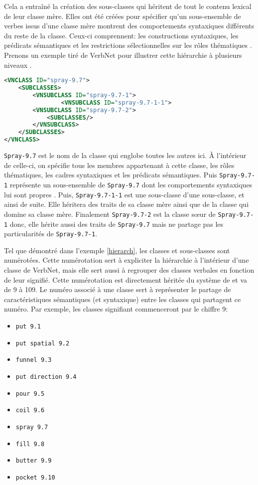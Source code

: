 Cela a entraîné la création des sous-classes qui héritent de tout le contenu lexical de leur classe mère. Elles ont été créées pour spécifier qu'un sous-ensemble de verbes issus d'une classe mère montrent des comportements syntaxiques différents du reste de la classe. Ceux-ci comprennent: les constructions syntaxiques, les prédicats sémantiques et les restrictions sélectionnelles sur les rôles thématiques \citep{SchulerVerbnetBroadcoverageComprehensive2005}. Prenons un exemple tiré de VerbNet pour illustrer cette hiérarchie à plusieurs niveaux \citep{CLEARVerbNetAnnotationGuidelines2005}.

\begin{lstlisting}[language=XML, caption = Hiérarchie, label=hierarch]
<VNCLASS ID="spray-9.7">
    <SUBCLASSES>
        <VNSUBCLASS ID="spray-9.7-1">
                <VNSUBCLASS ID="spray-9.7-1-1">
        <VNSUBCLASS ID="spray-9.7-2">
            <SUBCLASSES/>
        </VNSUBCLASS>
    </SUBCLASSES>
</VNCLASS>
\end{lstlisting}

\texttt{Spray-9.7} est le nom de la classe qui englobe toutes les autres ici. À l'intérieur de celle-ci, on spécifie tous les membres appartenant à cette classe, les rôles thématiques, les cadres syntaxiques et les prédicats sémantiques. Puis \texttt{Spray-9.7-1} représente un sous-ensemble de \texttt{Spray-9.7} dont les comportements syntaxiques lui sont propres .  Puis, \texttt{Spray-9.7-1-1} est une sous-classe d'une sous-classe, et ainsi de suite. Elle héritera des traits de sa classe mère ainsi que de la classe qui domine sa classe mère. Finalement \texttt{Spray-9.7-2} est la classe sœur de \texttt{Spray-9.7-1} donc, elle hérite aussi des traits de \texttt{Spray-9.7} mais ne partage pas les particularités de \texttt{Spray-9.7-1}.

Tel que démontré dans l'exemple \ref{hierarch}, les classes et sous-classes sont numérotées. Cette numérotation sert à expliciter la hiérarchie à l'intérieur d'une classe de VerbNet, mais elle sert aussi à regrouper des classes verbales en fonction de leur signifié. Cette numérotation est directement héritée du système de \cite{verb-classes.levin.1993} et va de 9 à 109. Le numéro associé à une classe sert à représenter le partage de caractéristiques sémantiques (et syntaxique) entre les classes qui partagent ce numéro. Par exemple, les classes signifiant  commenceront par le chiffre 9:

\begin{itemize}
  \item \texttt{put 9.1}
	\item \texttt{put spatial 9.2}
	\item \texttt{funnel 9.3}
	\item \texttt{put direction 9.4}
	\item \texttt{pour 9.5}
	\item \texttt{coil 9.6}
	\item \texttt{spray 9.7}
	\item \texttt{fill 9.8}
	\item \texttt{butter 9.9}
	\item \texttt{pocket 9.10}
\end{itemize}

